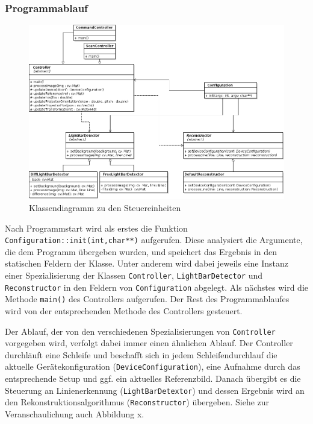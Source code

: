 \documentclass[ngerman,a4paper,parskip=half]{scrartcl}
\begin{document}
\subsubsection{Programmablauf}

\begin{figure}
	\centering
	\includegraphics[width=\linewidth]{includes/classdiagram_control.png}
	\caption{Klassendiagramm zu den Steuereinheiten}
	\label{fig:classes_control}
\end{figure}

Nach Programmstart wird als erstes die Funktion \texttt{Configuration::init(int,char**)} aufgerufen. Diese analysiert die Argumente, die dem Programm übergeben wurden, und speichert das Ergebnis in den statischen Feldern der Klasse. Unter anderem wird dabei jeweils eine Instanz einer Spezialisierung der Klassen \texttt{Controller}, \texttt{LightBarDetector} und \texttt{Reconstructor} in den Feldern von \texttt{Configuration} abgelegt. Als nächstes wird die Methode \texttt{main()} des Controllers aufgerufen. Der Rest des Programmablaufes wird von der entsprechenden Methode des Controllers gesteuert.

Der Ablauf, der von den verschiedenen Spezialisierungen von \texttt{Controller} vorgegeben wird, verfolgt dabei immer einen ähnlichen Ablauf. Der Controller durchläuft eine Schleife und beschafft sich in jedem Schleifendurchlauf die aktuelle Gerätekonfiguration (\texttt{DeviceConfiguration}), eine Aufnahme durch das entsprechende Setup und ggf. ein aktuelles Referenzbild. Danach übergibt es die Steuerung an Linienerkennung (\texttt{LightBarDetextor}) und dessen Ergebnis wird an den Rekonstruktionsalgorithmus (\texttt{Reconstructor}) übergeben. Siehe zur Veranschaulichung auch {\color{red} Abbildung x}.
\end{document}
